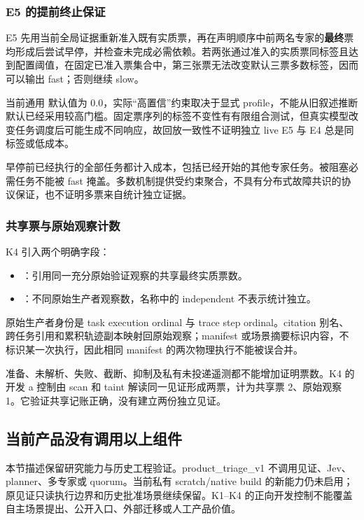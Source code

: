 \subsubsection{E5 的提前终止保证}
E5 先用当前全局证据重新准入既有实质票，再在声明顺序中前两名专家的\textbf{最终}票均形成后尝试早停，并检查未完成必需依赖。若两张通过准入的实质票同标签且达到配置阈值，在固定已准入票集合中，第三张票无法改变默认三票多数标签，因而可以输出 fast；否则继续 slow。

当前通用  默认值为 0.0，实际“高置信”约束取决于显式 profile，不能从旧叙述推断默认已经采用较高门槛。固定票序列的标签不变性有有限组合测试，但真实模型改变任务调度后可能生成不同响应，故回放一致性不证明独立 live E5 与 E4 总是同标签或低成本。

早停前已经执行的全部任务都计入成本，包括已经开始的其他专家任务。被阻塞必需任务不能被 fast 掩盖。多数机制提供受约束聚合，不具有分布式故障共识的协议保证，也不证明多票来自统计独立证据。

\subsubsection{共享票与原始观察计数}
K4 引入两个明确字段：
\begin{itemize}
\item {}：引用同一充分原始验证观察的共享最终实质票数。
\item {}：不同原始生产者观察数，名称中的 independent 不表示统计独立。
\end{itemize}
原始生产者身份是 task execution ordinal 与 trace step ordinal。citation 别名、跨任务引用和累积轨迹副本映射回原始观察；manifest 或场景摘要标识内容，不标识某一次执行，因此相同 manifest 的两次物理执行不能被误合并。

准备、未解析、失败、截断、抑制及私有未投递遥测都不能增加证明票数。K4 的开发 a 控制由 scan 和 taint 解读同一见证形成两票，计为共享票 2、原始观察 1。它验证共享记账正确，没有建立两份独立见证。\cite{k4}


\subsection{当前产品没有调用以上组件}
本节描述保留研究能力与历史工程验证。product\_triage\_v1 不调用见证、Jev、planner、多专家或 quorum。当前私有 scratch/native build 的新能力仍未启用；原见证只读执行边界和历史批准场景继续保留。K1--K4 的正向开发控制不能覆盖自主场景提出、公开入口、外部迁移或人工产品价值。\citep{acceptance,gate}
